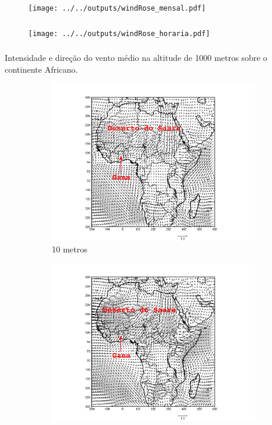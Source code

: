 \begin{frame}
	\frametitle{}
	\begin{figure}[H]
	\centering
		\texttt{[image: ../../outputs/windRose\_mensal.pdf]}
    \end{figure}
\end{frame}

\begin{frame}
	\frametitle{}
	\begin{figure}[H]
		\centering
		\texttt{[image: ../../outputs/windRose\_horaria.pdf]}
	\end{figure}
\end{frame}


\begin{frame}
\frametitle{}
					Intensidade e direção do vento médio na altitude de 1000 metros 
					sobre o continente Africano.
\begin{figure}[H]
\centering
  \begin{subfigure}[b]{0.5\linewidth}
    \includegraphics[width=\linewidth]{../../inputs/grads/gimp/1000hPa/JAN_2008.pdf}
    \caption{10 metros}
  \end{subfigure}%
  \begin{subfigure}[b]{0.5\linewidth}
    \includegraphics[width=\linewidth]{../../inputs/grads/gimp/875hPa/JAN_2008.pdf}

\end{subfigure}
\end{figure}
\end{frame}
